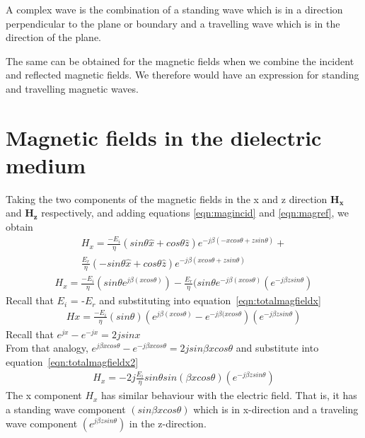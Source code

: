 A complex wave is the combination of a standing wave which is in a direction perpendicular to the plane or boundary and a travelling wave which is in the direction of the plane.

The same can be obtained for the magnetic fields when we combine the incident and reflected magnetic fields. We therefore
would have an expression for standing and travelling magnetic waves.

\section{Magnetic fields in the dielectric medium}
Taking the two components of the magnetic fields in the x and z direction
$\boldsymbol{H_x}$ and $\boldsymbol{H_z}$ respectively, and adding equations \ref{eqn:magincid} and \ref{eqn:magref}, we obtain
\begin{align*}
H_x = \frac{-E_i}{\eta} (sin\theta \hat{x} + cos\theta \hat{z}) e^{-j\beta( -xcos\theta + zsin\theta)} +\\ 
\frac{E_r}{\eta} \left(-sin\theta \hat{x} + cos\theta \hat{z}\right) e^{-j\beta( xcos\theta + zsin\theta)}
\end{align*}
\begin{align}
H_x = \frac{-E_i}{\eta}(sin\theta e^{j\beta( xcos\theta)} ) - \frac{E_r}{\eta}(sin\theta e^{-j\beta( xcos\theta)} (e^{-j\beta zsin\theta})
\label{eqn:totalmagfieldx}
\end{align}
Recall that $E_i$ = -$E_r$ and substituting into equation~\ref{eqn:totalmagfieldx}
\begin{align}
Hx = \frac{-E_i}{\eta}(sin\theta)( e^{j\beta( xcos\theta)} - e^{-j\beta( xcos\theta}) (e^{-j\beta zsin\theta})
\label{eqn:totalmagfieldx2}
\end{align}
Recall that $e^{jx} - e^{-jx} = 2jsinx$ \\
From that analogy, $e^{j\beta xcos\theta} - e^{-j\beta xcos\theta} = 2jsin\beta xcos\theta$ and substitute into
equation~\eqref{eqn:totalmagfieldx2}
\begin{align}
H_x =  -2j \frac{E_i}{\eta}sin\theta sin(\beta xcos\theta)(e^{-j\beta zsin\theta})
\end{align} 
The x component $H_x$ has similar behaviour with the electric field. That is, it has a standing wave component $(sin\beta xcos\theta)$ which is in x-direction and a traveling wave component $(e^{j\beta zsin\theta})$ in the z-direction.

